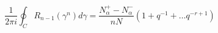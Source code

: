 \begin{equation}
\frac{1}{2\pi i}\oint_C R_{n-1}(\gamma^n)d\gamma
= \frac{N^+_\alpha-N^-_\alpha}{nN} (1+q^{-1}+\dots q^{-r+1})
\end{equation}


